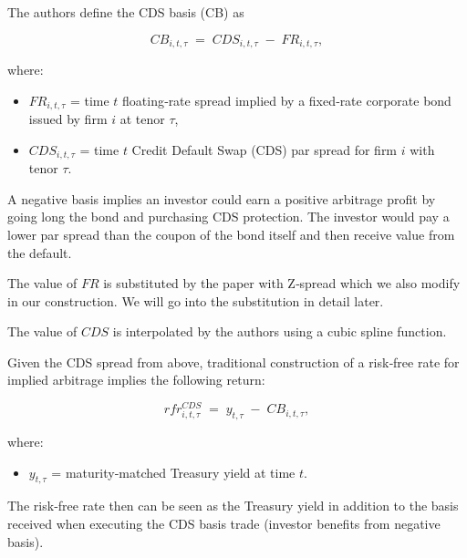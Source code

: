 \documentclass{article}
\begin{document}
The authors define the CDS basis (CB) as

\begin{equation}
  CB_{i,t,\tau} \;=\; CDS_{i,t,\tau} \;-\; FR_{i,t,\tau},
\end{equation}

where:
\begin{itemize}
  \item $FR_{i,t,\tau}$ = time $t$ floating‐rate spread implied by a fixed‐rate corporate bond issued by firm $i$ at tenor $\tau$,
  \item $CDS_{i,t,\tau}$ = time $t$ Credit Default Swap (CDS) par spread for firm $i$ with tenor $\tau$.
\end{itemize}

A negative basis implies an investor could earn a positive arbitrage profit by going long the bond and purchasing CDS protection. The investor would pay a lower par spread than the coupon of the bond itself and then receive value from the default.

The value of $FR$ is substituted by the paper with Z‐spread which we also modify in our construction. We will go into the substitution in detail later.

The value of $CDS$ is interpolated by the authors using a cubic spline function.

Given the CDS spread from above, traditional construction of a risk‐free rate for implied arbitrage implies the following return:

\begin{equation}
  rfr^{CDS}_{i,t,\tau} \;=\; y_{t,\tau} \;-\; CB_{i,t,\tau},
\end{equation}

where:
\begin{itemize}
  \item $y_{t,\tau}$ = maturity‐matched Treasury yield at time $t$.
\end{itemize}

The risk‐free rate then can be seen as the Treasury yield in addition to the basis received when executing the CDS basis trade (investor benefits from negative basis).
\end{document}
